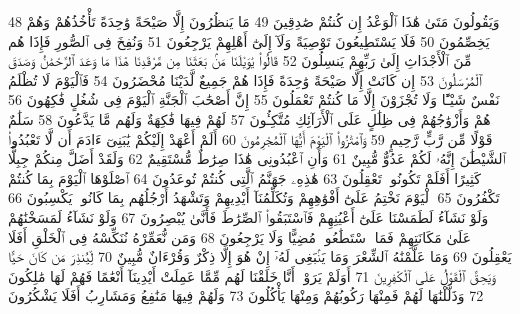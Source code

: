 {\tiny\colorbox{cl_aya}{48}} وَيَقُولُونَ مَتَىٰ هَٰذَا ٱلْوَعْدُ إِن كُنتُمْ صَٰدِقِينَ
{\tiny\colorbox{cl_aya}{49}} مَا يَنظُرُونَ إِلَّا صَيْحَةً وَٰحِدَةً تَأْخُذُهُمْ وَهُمْ يَخِصِّمُونَ
{\tiny\colorbox{cl_aya}{50}} فَلَا يَسْتَطِيعُونَ تَوْصِيَةً وَلَآ إِلَىٰٓ أَهْلِهِمْ يَرْجِعُونَ
{\tiny\colorbox{cl_aya}{51}} وَنُفِخَ فِى ٱلصُّورِ فَإِذَا هُم مِّنَ ٱلْأَجْدَاثِ إِلَىٰ رَبِّهِمْ يَنسِلُونَ
{\tiny\colorbox{cl_aya}{52}} قَالُوا۟ يَٰوَيْلَنَا مَنۢ بَعَثَنَا مِن مَّرْقَدِنَا هَٰذَا مَا وَعَدَ ٱلرَّحْمَٰنُ وَصَدَقَ ٱلْمُرْسَلُونَ
{\tiny\colorbox{cl_aya}{53}} إِن كَانَتْ إِلَّا صَيْحَةً وَٰحِدَةً فَإِذَا هُمْ جَمِيعٌ لَّدَيْنَا مُحْضَرُونَ
{\tiny\colorbox{cl_aya}{54}} فَٱلْيَوْمَ لَا تُظْلَمُ نَفْسٌ شَيْـًٔا وَلَا تُجْزَوْنَ إِلَّا مَا كُنتُمْ تَعْمَلُونَ
{\tiny\colorbox{cl_aya}{55}} إِنَّ أَصْحَٰبَ ٱلْجَنَّةِ ٱلْيَوْمَ فِى شُغُلٍ فَٰكِهُونَ
{\tiny\colorbox{cl_aya}{56}} هُمْ وَأَزْوَٰجُهُمْ فِى ظِلَٰلٍ عَلَى ٱلْأَرَآئِكِ مُتَّكِـُٔونَ
{\tiny\colorbox{cl_aya}{57}} لَهُمْ فِيهَا فَٰكِهَةٌ وَلَهُم مَّا يَدَّعُونَ
{\tiny\colorbox{cl_aya}{58}} سَلَٰمٌ قَوْلًا مِّن رَّبٍّ رَّحِيمٍ
{\tiny\colorbox{cl_aya}{59}} وَٱمْتَٰزُوا۟ ٱلْيَوْمَ أَيُّهَا ٱلْمُجْرِمُونَ
{\tiny\colorbox{cl_aya}{60}} أَلَمْ أَعْهَدْ إِلَيْكُمْ يَٰبَنِىٓ ءَادَمَ أَن لَّا تَعْبُدُوا۟ ٱلشَّيْطَٰنَ إِنَّهُۥ لَكُمْ عَدُوٌّ مُّبِينٌ
{\tiny\colorbox{cl_aya}{61}} وَأَنِ ٱعْبُدُونِى هَٰذَا صِرَٰطٌ مُّسْتَقِيمٌ
{\tiny\colorbox{cl_aya}{62}} وَلَقَدْ أَضَلَّ مِنكُمْ جِبِلًّا كَثِيرًا أَفَلَمْ تَكُونُوا۟ تَعْقِلُونَ
{\tiny\colorbox{cl_aya}{63}} هَٰذِهِۦ جَهَنَّمُ ٱلَّتِى كُنتُمْ تُوعَدُونَ
{\tiny\colorbox{cl_aya}{64}} ٱصْلَوْهَا ٱلْيَوْمَ بِمَا كُنتُمْ تَكْفُرُونَ
{\tiny\colorbox{cl_aya}{65}} ٱلْيَوْمَ نَخْتِمُ عَلَىٰٓ أَفْوَٰهِهِمْ وَتُكَلِّمُنَآ أَيْدِيهِمْ وَتَشْهَدُ أَرْجُلُهُم بِمَا كَانُوا۟ يَكْسِبُونَ
{\tiny\colorbox{cl_aya}{66}} وَلَوْ نَشَآءُ لَطَمَسْنَا عَلَىٰٓ أَعْيُنِهِمْ فَٱسْتَبَقُوا۟ ٱلصِّرَٰطَ فَأَنَّىٰ يُبْصِرُونَ
{\tiny\colorbox{cl_aya}{67}} وَلَوْ نَشَآءُ لَمَسَخْنَٰهُمْ عَلَىٰ مَكَانَتِهِمْ فَمَا ٱسْتَطَٰعُوا۟ مُضِيًّا وَلَا يَرْجِعُونَ
{\tiny\colorbox{cl_aya}{68}} وَمَن نُّعَمِّرْهُ نُنَكِّسْهُ فِى ٱلْخَلْقِ أَفَلَا يَعْقِلُونَ
{\tiny\colorbox{cl_aya}{69}} وَمَا عَلَّمْنَٰهُ ٱلشِّعْرَ وَمَا يَنۢبَغِى لَهُۥٓ إِنْ هُوَ إِلَّا ذِكْرٌ وَقُرْءَانٌ مُّبِينٌ
{\tiny\colorbox{cl_aya}{70}} لِّيُنذِرَ مَن كَانَ حَيًّا وَيَحِقَّ ٱلْقَوْلُ عَلَى ٱلْكَٰفِرِينَ
{\tiny\colorbox{cl_aya}{71}} أَوَلَمْ يَرَوْا۟ أَنَّا خَلَقْنَا لَهُم مِّمَّا عَمِلَتْ أَيْدِينَآ أَنْعَٰمًا فَهُمْ لَهَا مَٰلِكُونَ
{\tiny\colorbox{cl_aya}{72}} وَذَلَّلْنَٰهَا لَهُمْ فَمِنْهَا رَكُوبُهُمْ وَمِنْهَا يَأْكُلُونَ
{\tiny\colorbox{cl_aya}{73}} وَلَهُمْ فِيهَا مَنَٰفِعُ وَمَشَارِبُ أَفَلَا يَشْكُرُونَ
